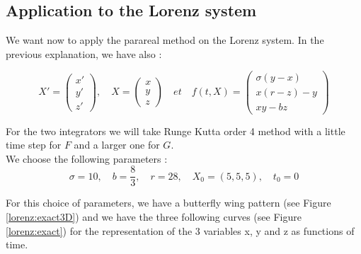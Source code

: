 \subsection{Application to the Lorenz system}

We want now to apply the parareal method on the Lorenz system. In the previous explanation, we have also :

$$X'=\begin{pmatrix}
    x' \\
    y' \\
    z'
\end{pmatrix}, \quad X=\begin{pmatrix}
    x \\
    y \\
    z
\end{pmatrix} \quad et \quad f(t,X)=\begin{pmatrix}
    \sigma(y-x) \\
    x(r-z)-y \\
    xy-bz
\end{pmatrix}$$

\noindent For the two integrators we will take Runge Kutta order 4 method with a little time step for $F$ and a larger one for $G$. \\

\noindent We choose the following parameters :
$$\sigma=10, \quad b=\frac{8}{3}, \quad r=28, \quad X_0=(5,5,5), \quad t_0=0$$

\noindent For this choice of parameters, we have a butterfly wing pattern (see Figure \ref{lorenz:exact3D}) and we have the three following curves (see Figure \ref{lorenz:exact}) for the representation of the 3 variables x, y and z as functions of time.

